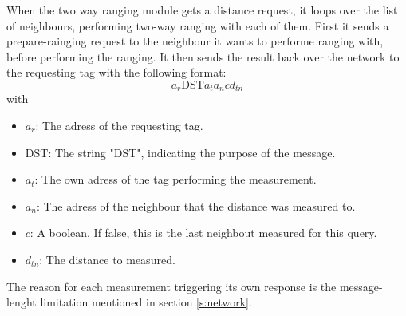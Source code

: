 When the two way ranging module gets a distance request, it loops over the list of neighbours, performing two-way ranging with each of them.
First it sends a prepare-rainging request to the neighbour it wants to performe ranging with, before performing the ranging.
It then sends the result back over the network to the requesting tag with the following format: 
\begin{equation}
	\mbox{$a_r$DST$a_ta_ncd_{tn}$}
\end{equation}
with
\begin{itemize}
	\item $a_r$: The adress of the requesting tag.
	\item DST: The string "DST", indicating the purpose of the message.
	\item $a_t$: The own adress of the tag performing the measurement.
	\item $a_n$: The adress of the neighbour that the distance was measured to.
	\item $c$: A boolean. If false, this is the last neighbout measured for this query.
	\item $d_{tn}$: The distance to measured. 
\end{itemize}
The reason for each measurement triggering its own response is the message-lenght limitation mentioned in section \ref{s:network}.

